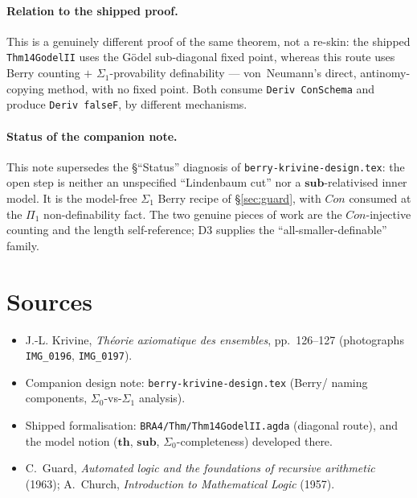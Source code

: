 \documentclass[11pt]{article}
\theoremstyle{plain}
\theoremstyle{definition}
\theoremstyle{remark}
\newcommand{\Con}{\mathit{Con}}
\newcommand{\thmT}{\mathbf{th}}
\newcommand{\sub}{\mathbf{sub}}
\begin{document}
\paragraph{Relation to the shipped proof.}  This is a genuinely
different proof of the same theorem, not a re-skin: the shipped
\texttt{Thm14GodelII} uses the G\"odel sub-diagonal fixed point, whereas
this route uses Berry counting $+$ $\Sigma_1$-provability definability ---
von~Neumann's direct, antinomy-copying method, with no fixed point.  Both
consume \texttt{Deriv ConSchema} and produce \texttt{Deriv falseF}, by
different mechanisms.

\paragraph{Status of the companion note.}  This note supersedes the
{\S}``Status'' diagnosis of \texttt{berry-krivine-design.tex}: the open
step is neither an unspecified ``Lindenbaum cut'' nor a $\sub$-relativised
inner model.  It is the model-free $\Sigma_1$ Berry recipe of
{\S}\ref{sec:guard}, with $\Con$ consumed at the $\Pi_1$ non-definability
fact.  The two genuine pieces of work are the $\Con$-injective counting
and the length self-reference; D3 supplies the ``all-smaller-definable''
family.

\section*{Sources}
\begin{itemize}
\item J.-L. Krivine, \emph{Th\'eorie axiomatique des ensembles},
  pp.~126--127 (photographs \texttt{IMG\_0196}, \texttt{IMG\_0197}).
\item Companion design note: \texttt{berry-krivine-design.tex} (Berry/
  naming components, $\Sigma_0$-vs-$\Sigma_1$ analysis).
\item Shipped formalisation: \texttt{BRA4/Thm/Thm14GodelII.agda}
  (diagonal route), and the model notion ($\thmT$, $\sub$,
  $\Sigma_0$-completeness) developed there.
\item C.~Guard, \emph{Automated logic and the foundations of recursive
  arithmetic} (1963); A.~Church, \emph{Introduction to Mathematical
  Logic} (1957).
\end{itemize}
\end{document}
